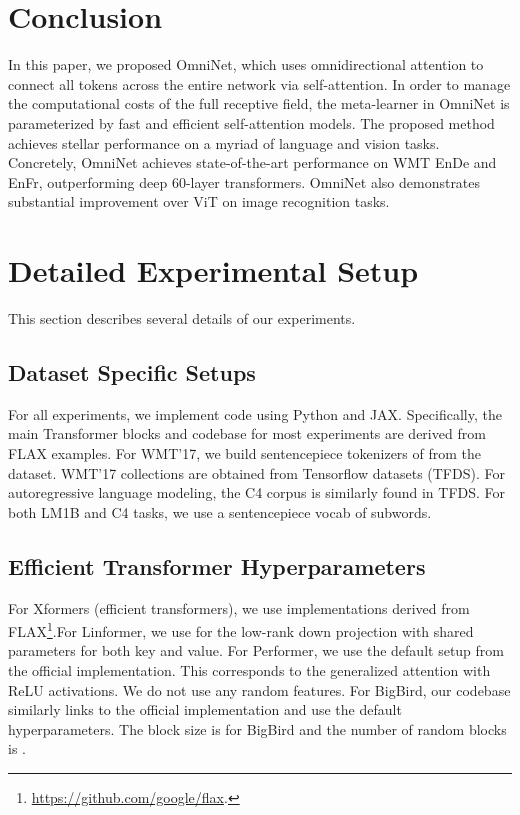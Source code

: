 \documentclass{article}
\begin{document}
\section{Conclusion}
\vspace{-1pt}
In this paper, we proposed OmniNet, which uses omnidirectional attention to connect all tokens across the entire network via self-attention. In order to manage the computational costs of the full receptive field, the meta-learner in OmniNet is parameterized by fast and efficient self-attention models. The proposed method achieves stellar performance on a myriad of language and vision tasks. Concretely, OmniNet achieves state-of-the-art performance on WMT EnDe and EnFr, outperforming deep 60-layer transformers. OmniNet also demonstrates substantial improvement over ViT on image recognition tasks. 





\newpage
\appendix
\section{Detailed Experimental Setup}
This section describes several details of our experiments.
\subsection{Dataset Specific Setups}
For all experiments, we implement code using Python and JAX. Specifically, the main Transformer blocks and codebase for most experiments are derived from FLAX examples. For WMT'17, we build sentencepiece tokenizers of  from the dataset. WMT'17 collections are obtained from Tensorflow datasets (TFDS). For autoregressive language modeling, the C4 corpus is similarly found in TFDS. For both LM1B and C4 tasks, we use a sentencepiece vocab of  subwords.

\subsection{Efficient Transformer Hyperparameters} For Xformers (efficient transformers), we use implementations derived from FLAX\footnote{\url{https://github.com/google/flax}.}.For Linformer, we use  for the low-rank down projection with shared parameters for both key and value. For Performer, we use the default setup from the official implementation. This corresponds to the generalized attention with ReLU activations. We do not use any random features. For BigBird, our codebase similarly links to the official implementation and use the default hyperparameters. The block size is  for BigBird and the number of random blocks is .
\end{document}
